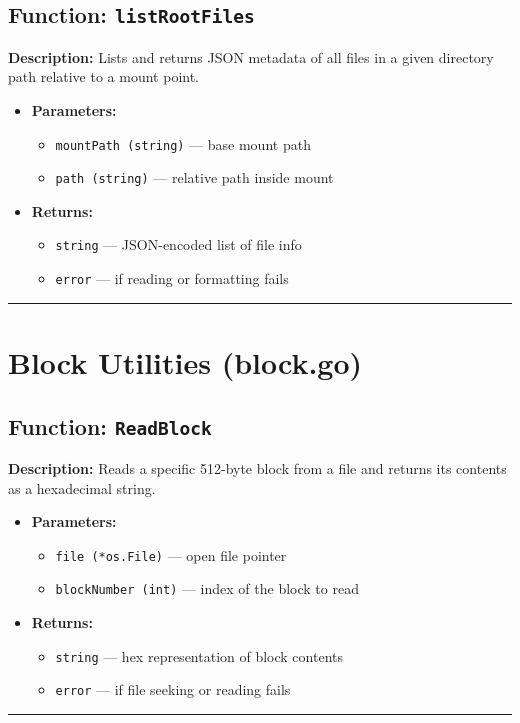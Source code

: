 \documentclass[12pt,a4paper]{article}
\begin{document}
\subsection*{Function: \texttt{listRootFiles}}
\textbf{Description:} Lists and returns JSON metadata of all files in a given directory path relative to a mount point.
\begin{itemize}[leftmargin=2cm,label={--}]
  \item \textbf{Parameters:}
  \begin{itemize}
    \item \texttt{mountPath (string)} — base mount path
    \item \texttt{path (string)} — relative path inside mount
  \end{itemize}
  \item \textbf{Returns:}
  \begin{itemize}
    \item \texttt{string} — JSON-encoded list of file info
    \item \texttt{error} — if reading or formatting fails
  \end{itemize}
\end{itemize}
\hrule\vspace{2em}


\newpage


\section{Block Utilities (block.go)}

\subsection*{Function: \texttt{ReadBlock}}
\textbf{Description:} Reads a specific 512-byte block from a file and returns its contents as a hexadecimal string.
\begin{itemize}[leftmargin=2cm,label={--}]
  \item \textbf{Parameters:}
  \begin{itemize}
    \item \texttt{file (*os.File)} — open file pointer
    \item \texttt{blockNumber (int)} — index of the block to read
  \end{itemize}
  \item \textbf{Returns:}
  \begin{itemize}
    \item \texttt{string} — hex representation of block contents
    \item \texttt{error} — if file seeking or reading fails
  \end{itemize}
\end{itemize}
\hrule\vspace{1em}
\end{document}
